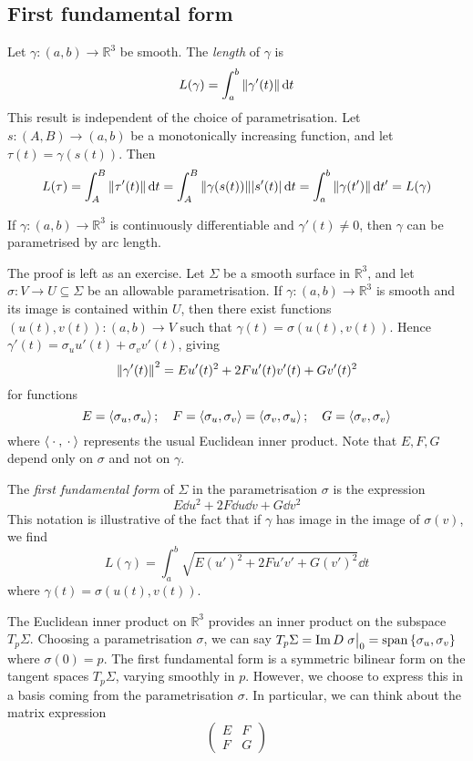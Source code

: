 \subsection{First fundamental form}
Let \( \gamma \colon (a,b) \to \mathbb R^3 \) be smooth.
The \textit{length} of \( \gamma \) is
\[ L(\gamma) = \int_a^b \norm{\gamma'(t)} \dd{t} \]
This result is independent of the choice of parametrisation.
Let \( s \colon (A,B) \to (a,b) \) be a monotonically increasing function, and let \( \tau(t) = \gamma(s(t)) \).
Then
\[ L(\tau) = \int_A^B \norm{\tau'(t)} \dd{t} = \int_A^B \norm{\gamma(s(t))} \abs{s'(t)} \dd{t} = \int_a^b \norm{\gamma(t')} \dd{t'} = L(\gamma) \]
\begin{lemma}
	If \( \gamma \colon (a,b) \to \mathbb R^3 \) is continuously differentiable and \( \gamma'(t) \neq 0 \), then \( \gamma \) can be parametrised by arc length.
\end{lemma}
The proof is left as an exercise.
Let \( \Sigma \) be a smooth surface in \( \mathbb R^3 \), and let \( \sigma \colon V \to U \subseteq \Sigma \) be an allowable parametrisation.
If \( \gamma \colon (a,b) \to \mathbb R^3 \) is smooth and its image is contained within \( U \), then there exist functions \( (u(t), v(t)) \colon (a,b) \to V \) such that \( \gamma(t) = \sigma(u(t), v(t)) \).
Hence \( \gamma'(t) = \sigma_u u'(t) + \sigma_v v'(t) \), giving
\[ \norm{\gamma'(t)}^2 = E u'(t)^2 + 2F u'(t) v'(t) + G v'(t)^2 \]
for functions
\[ E = \left\langle{\sigma_u, \sigma_u}\right\rangle;\quad F = \left\langle{\sigma_u, \sigma_v}\right\rangle = \left\langle{\sigma_v, \sigma_u}\right\rangle;\quad G = \left\langle{\sigma_v, \sigma_v}\right\rangle \]
where \( \left\langle{{}\cdot{},{}\cdot{}}\right\rangle \) represents the usual Euclidean inner product.
Note that \( E, F, G \) depend only on \( \sigma \) and not on \( \gamma \).
\begin{definition}
	The \textit{first fundamental form} of \( \Sigma \) in the parametrisation \( \sigma \) is the expression
	\[ E \dd{u}^2 + 2F \dd{u} \dd{v} + G \dd{v}^2 \]
	This notation is illustrative of the fact that if \( \gamma \) has image in the image of \( \sigma(v) \), we find
	\[ L(\gamma) = \int_a^b \sqrt{E (u')^2 + 2F u'v' + G (v')^2} \dd{t} \]
	where \( \gamma(t) = \sigma(u(t),v(t)) \).
\end{definition}
\begin{remark}
	The Euclidean inner product on \( \mathbb R^3 \) provides an inner product on the subspace \( T_p \Sigma \).
	Choosing a parametrisation \( \sigma \), we can say \( T_p \Sigma = \Im D \eval{\sigma}_0 = \vecspan{\qty{\sigma_u, \sigma_v}} \) where \( \sigma(0) = p \).
	The first fundamental form is a symmetric bilinear form on the tangent spaces \( T_p \Sigma \), varying smoothly in \( p \).
	However, we choose to express this in a basis coming from the parametrisation \( \sigma \).
	In particular, we can think about the matrix expression
	\[ \begin{pmatrix}
		E & F \\
		F & G
	\end{pmatrix} \]
\end{remark}
